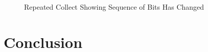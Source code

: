 \documentclass{article}
\begin{document}
\begin{figure}[H]
	\centerline{}
	\caption{Repeated Collect Showing Sequence of Bits Has Changed}
	\label{fig::car_key_spectrogram_repeat}
\end{figure}
 
\section{Conclusion}

%
%
	
\end{document}
